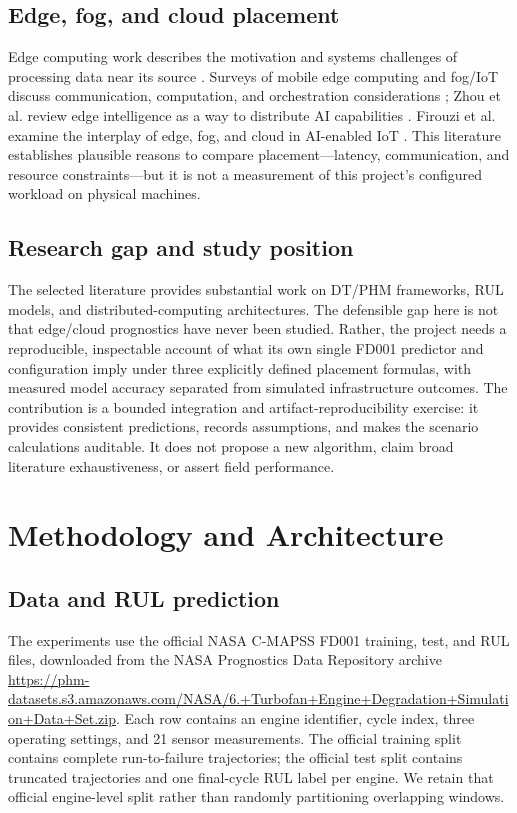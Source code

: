 ﻿\documentclass[conference]{IEEEtran}
\begin{document}
\subsection{Edge, fog, and cloud placement}
Edge computing work describes the motivation and systems challenges of processing data near its source \cite{shi2016,satya2017}. Surveys of mobile edge computing and fog/IoT discuss communication, computation, and orchestration considerations \cite{mao2017,abbas2018,chiang2016,naha2018}; Zhou et al. review edge intelligence as a way to distribute AI capabilities \cite{zhou2019}. Firouzi et al. examine the interplay of edge, fog, and cloud in AI-enabled IoT \cite{firouzi2022}. This literature establishes plausible reasons to compare placement—latency, communication, and resource constraints—but it is not a measurement of this project's configured workload on physical machines.

\subsection{Research gap and study position}
The selected literature provides substantial work on DT/PHM frameworks, RUL models, and distributed-computing architectures. The defensible gap here is not that edge/cloud prognostics have never been studied. Rather, the project needs a reproducible, inspectable account of what its own single FD001 predictor and configuration imply under three explicitly defined placement formulas, with measured model accuracy separated from simulated infrastructure outcomes. The contribution is a bounded integration and artifact-reproducibility exercise: it provides consistent predictions, records assumptions, and makes the scenario calculations auditable. It does not propose a new algorithm, claim broad literature exhaustiveness, or assert field performance.

\section{Methodology and Architecture}
\subsection{Data and RUL prediction}
The experiments use the official NASA C-MAPSS FD001 training, test, and RUL files, downloaded from the NASA Prognostics Data Repository archive \url{https://phm-datasets.s3.amazonaws.com/NASA/6.+Turbofan+Engine+Degradation+Simulation+Data+Set.zip}. Each row contains an engine identifier, cycle index, three operating settings, and 21 sensor measurements. The official training split contains complete run-to-failure trajectories; the official test split contains truncated trajectories and one final-cycle RUL label per engine. We retain that official engine-level split rather than randomly partitioning overlapping windows.
\end{document}
